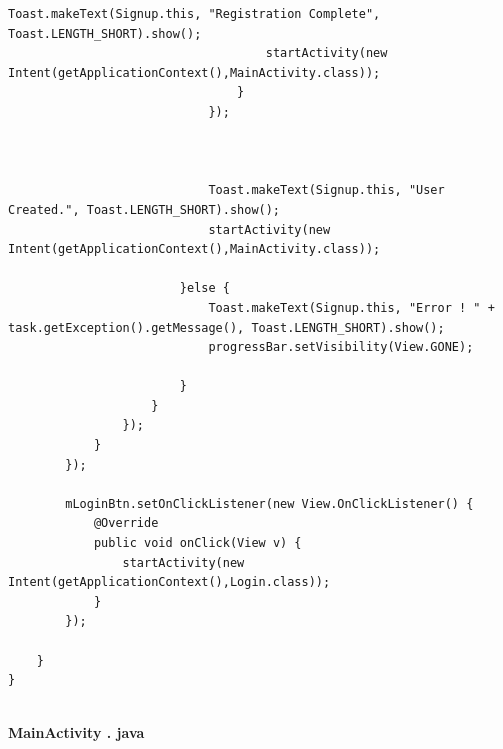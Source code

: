 \documentclass[12pt,a4paper]{article}
\begin{document}
\begin{lstlisting}[frame=single]
                                    Toast.makeText(Signup.this, "Registration Complete", Toast.LENGTH_SHORT).show();
                                    startActivity(new Intent(getApplicationContext(),MainActivity.class));
                                }
                            });



                            Toast.makeText(Signup.this, "User Created.", Toast.LENGTH_SHORT).show();
                            startActivity(new Intent(getApplicationContext(),MainActivity.class));

                        }else {
                            Toast.makeText(Signup.this, "Error ! " + task.getException().getMessage(), Toast.LENGTH_SHORT).show();
                            progressBar.setVisibility(View.GONE);

                        }
                    }
                });
            }
        });

        mLoginBtn.setOnClickListener(new View.OnClickListener() {
            @Override
            public void onClick(View v) {
                startActivity(new Intent(getApplicationContext(),Login.class));
            }
        });

    }
}


\end{lstlisting}


\textbf{\large{MainActivity . java}}\\ 
\end{document}
